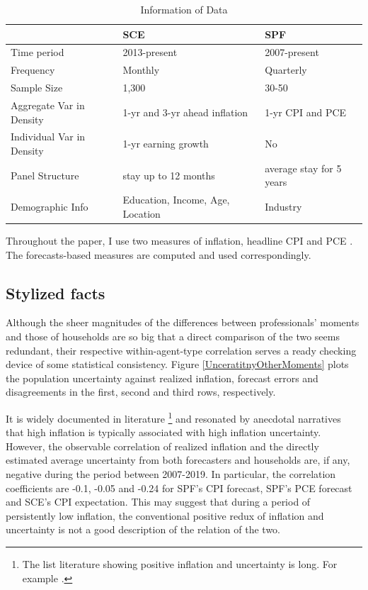 \documentclass[]{article}
\begin{document}
	\begin{table}[ht]
		\caption{Information of Data}
		\label{DataInfo}
		\begin{tabular}{lll} 
			
			\hline 
			& SCE & SPF        \\
			\hline 
			Time period                                    & 2013-present                            & 2007-present             \\
			Frequency                                      & Monthly                                 & Quarterly                \\
			Sample Size                                    & 1,300                                   & 30-50                    \\
			Aggregate Var in Density                       & 1-yr  and 3-yr ahead inflation          & 1-yr CPI and PCE         \\
			Individual Var in Density                      & 1-yr earning growth                     & No                       \\
			Panel Structure                               & stay up to 12 months                    & average stay for 5 years \\
			Demographic Info                        & Education, Income, Age, Location        & Industry    \\
			\hline 
		\end{tabular}
	\end{table}
	
	Throughout the paper, I use two measures of inflation, headline CPI and PCE . The forecasts-based measures are computed and used correspondingly.  
	
	\subsection{Stylized facts}
	
	Although the sheer magnitudes of the differences between professionals' moments and those of households are so big that a direct comparison of the two seems redundant, their respective within-agent-type correlation serves a ready checking device of some statistical consistency. Figure \ref{UnceratitnyOtherMoments} plots the population uncertainty against realized inflation,  forecast errors and disagreements in the first, second and third rows, respectively. 
	
	It is widely documented in literature \footnote{The list literature showing positive inflation and uncertainty is long. For example \citet{ball1990inflation}. } and resonated by anecdotal narratives that high inflation is typically associated with high inflation uncertainty. However, the observable correlation of realized inflation and the directly estimated average uncertainty from both  forecasters and households are, if any, negative during the period between 2007-2019. In particular, the correlation coefficients are -0.1, -0.05 and -0.24 for SPF's  CPI forecast, SPF's PCE forecast and SCE's CPI expectation. This may suggest that during a period of persistently low inflation, the conventional positive redux of inflation and uncertainty is not a good description of the relation of the two. 
	
\end{document}
